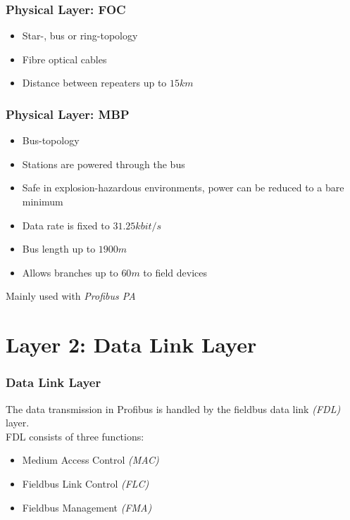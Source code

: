 \documentclass{beamer}
\begin{document}
\begin{frame}
  \frametitle{Physical Layer: FOC}
  \begin{itemize}
    \item Star-, bus or ring-topology
    \item Fibre optical cables
    \item Distance between repeaters up to $15km$
  \end{itemize}
\end{frame}

\begin{frame}
  \frametitle{Physical Layer: MBP}
  \begin{itemize}
    \item Bus-topology
    \item Stations are powered through the bus
    \item Safe in explosion-hazardous environments, power can be reduced to a bare minimum
    \item Data rate is fixed to $31.25kbit/s$
    \item Bus length up to $1900m$
    \item Allows branches up to $60m$ to field devices
  \end{itemize}
  Mainly used with \textit{Profibus PA}
\end{frame}

\section{Layer 2: Data Link Layer}
\begin{frame}
  \frametitle{Data Link Layer}
  The data transmission in Profibus is handled by the fieldbus data link \textit{(FDL)}
  layer. \\
  FDL consists of three functions:
  \begin{itemize}
    \item Medium Access Control \textit{(MAC)}
    \item Fieldbus Link Control \textit{(FLC)}
    \item Fieldbus Management \textit{(FMA)}
  \end{itemize}
\end{frame}
\end{document}
